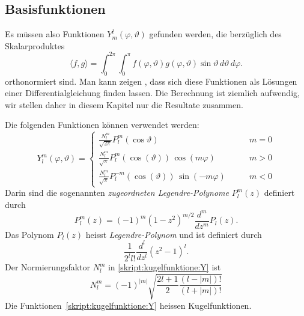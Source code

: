 \subsection{Basisfunktionen}
Es müssen also Funktionen $Y_m^l(\varphi,\vartheta)$ gefunden werden,
die berzüglich des Skalarproduktes
\begin{equation}
\langle f,g\rangle
=
\int_{0}^{2\pi} \int_0^\pi 
f(\varphi,\vartheta) g(\varphi,\vartheta)
\sin\vartheta\,d\vartheta\,d\varphi
\label{skript:kugelfunktionen:skalarprodukt}.
\end{equation}
orthonormiert sind.
Man kann zeigen \cite{skript:tabea}, dass sich diese Funktionen als Lösungen
einer Differentialgleichung finden lassen.
Die Berechnung ist ziemlich aufwendig, wir stellen daher in diesem
Kapitel nur die Resultate zusammen.

Die folgenden Funktionen können verwendet werden:
\begin{equation}
Y^m_l(\varphi,\vartheta)
=
\begin{cases}
\displaystyle
\frac{N^m_l}{\sqrt{2\pi}} P^m_l(\cos\vartheta)&\qquad m=0
\\[10pt]
\displaystyle
\frac{N^m_l}{\sqrt{\pi}} P^m_l(\cos(\vartheta))\,\cos(m\varphi)&\qquad m>0
\\[10pt]
\displaystyle
\frac{N^m_l}{\sqrt{\pi}} P^{-m}_l(\cos(\vartheta))\,\sin(-m\varphi)&\qquad m<0
\end{cases}
\label{skript:kugelfunktione:Y}
\end{equation}
Darin sind die sogenannten {\em zugeordneten Legendre-Polynome} $P^m_l(z)$
definiert durch
\begin{equation}
P^m_l(z)
=
(-1)^m(1-z^2)^{m/2}\frac{d^m}{dz^m}P_l(z).
\end{equation}
Das Polynom $P_l(z)$ heisst {\em Legendre-Polynom}
%
und ist definiert durch
\begin{equation}
\frac{1}{2^ll!}\frac{d^l}{dz^l}(z^2-1)^l.
\end{equation}
Der Normierungsfaktor $N^m_l$ in 
\eqref{skript:kugelfunktione:Y}
ist
\begin{equation}
N^m_l
=
(-1)^{|m|}\sqrt{
\frac{2l+1}{2}\frac{(l-|m|)!}{(l+|m|)!}
}
\end{equation}
Die Funktionen~\eqref{skript:kugelfunktione:Y} heissen Kugelfunktionen.

